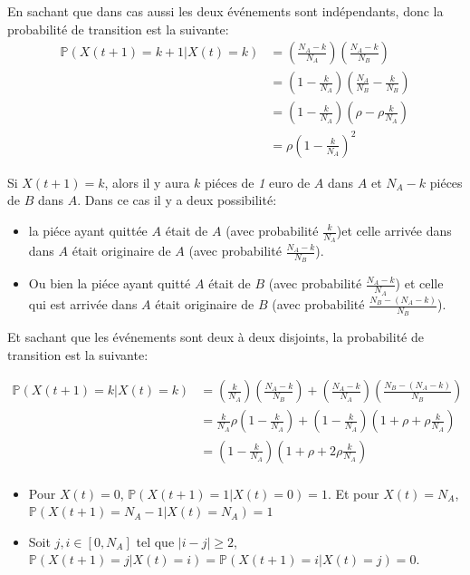 \documentclass[11pt,]{article}
\begin{document}
En sachant que dans cas aussi les deux événements sont indépendants,
donc la probabilité de transition est la suivante:\\

\begin{equation} 
\begin{split}
\mathbb{P}(X(t+1) =k+1|X(t)=k) &=(\frac{N_A-k}{N_A})(\frac{N_A-k}{N_B})\\
&=(1-\frac{k}{N_A})(\frac{N_A}{N_B}-\frac{k}{N_B})\\
&=(1-\frac{k}{N_A})(\rho-\rho\frac{k}{N_A})\\
&=\rho(1-\frac{k}{N_A})^2
\end{split}
\end{equation}

Si \(X(t+1)=k\), alors il y aura \(k\) piéces de \emph{1} euro de \(A\)
dans \(A\) et \(N_A-k\) piéces de \(B\) dans \(A\). Dans ce cas il y a
deux possibilité:

\begin{itemize}
\item
  la piéce ayant quittée \(A\) était de \(A\) (avec probabilité
  \(\frac{k}{N_A}\))et celle arrivée dans dans \(A\) était originaire de
  \(A\) (avec probabilité \(\frac{N_A-k}{N_B}\)).
\item
  Ou bien la piéce ayant quitté \(A\) était de \(B\) (avec probabilité
  \(\frac{N_A-k}{N_A}\)) et celle qui est arrivée dans \(A\) était
  originaire de \(B\) (avec probabilité \(\frac{N_B-(N_A-k)}{N_B}\)).
\end{itemize}

Et sachant que les événements sont deux à deux disjoints, la probabilité
de transition est la suivante:

\begin{equation} 
\begin{split}
\mathbb{P}(X(t+1) =k|X(t)=k)  
&=(\frac{k}{N_A})(\frac{N_A-k}{N_B})+(\frac{N_A-k}{N_A})(\frac{N_B-(N_A-k)}{N_B})\\
&=\frac{k}{N_A}\rho(1-\frac{k}{N_A})+(1-\frac{k}{N_A})(1+\rho+\rho\frac{k}{N_A})\\
&=(1-\frac{k}{N_A})(1+\rho+2\rho\frac{k}{N_A})\\
\end{split}
\end{equation}

\begin{itemize}
\item
  Pour \(X(t)=0\), \(\mathbb{P}(X(t+1)=1|X(t)=0)=1\). Et pour
  \(X(t)=N_A\),\\
  \(\mathbb{P}(X(t+1)=N_A-1|X(t)=N_A)=1\)
\item
  Soit \(j,i \in [0,N_A]\) tel que \(|i-j|\geq 2\),
  \(\mathbb{P}(X(t+1)=j|X(t)=i)=\mathbb{P}(X(t+1)=i|X(t)=j)=0\).
\end{itemize}
\end{document}
